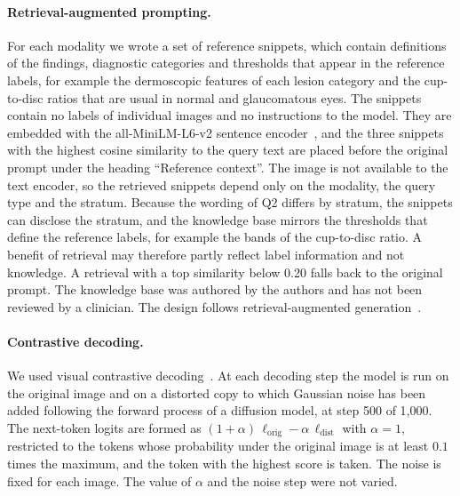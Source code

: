 \documentclass[11pt,a4paper]{article}
\begin{document}
\paragraph{Retrieval-augmented prompting.} For each modality we wrote a set of reference snippets, which contain definitions of the findings, diagnostic categories and thresholds that appear in the reference labels, for example the dermoscopic features of each lesion category and the cup-to-disc ratios that are usual in normal and glaucomatous eyes. The snippets contain no labels of individual images and no instructions to the model. They are embedded with the all-MiniLM-L6-v2 sentence encoder~\citep{reimers2019sbert}, and the three snippets with the highest cosine similarity to the query text are placed before the original prompt under the heading ``Reference context''. The image is not available to the text encoder, so the retrieved snippets depend only on the modality, the query type and the stratum. Because the wording of Q2 differs by stratum, the snippets can disclose the stratum, and the knowledge base mirrors the thresholds that define the reference labels, for example the bands of the cup-to-disc ratio. A benefit of retrieval may therefore partly reflect label information and not knowledge. A retrieval with a top similarity below 0.20 falls back to the original prompt. The knowledge base was authored by the authors and has not been reviewed by a clinician. The design follows retrieval-augmented generation~\citep{lewis2020rag}.

\paragraph{Contrastive decoding.} We used visual contrastive decoding~\citep{leng2024vcd}. At each decoding step the model is run on the original image and on a distorted copy to which Gaussian noise has been added following the forward process of a diffusion model, at step 500 of 1{,}000. The next-token logits are formed as $(1+\alpha)\,\ell_{\mathrm{orig}} - \alpha\,\ell_{\mathrm{dist}}$ with $\alpha=1$, restricted to the tokens whose probability under the original image is at least $0.1$ times the maximum, and the token with the highest score is taken. The noise is fixed for each image. The value of $\alpha$ and the noise step were not varied.
\end{document}
